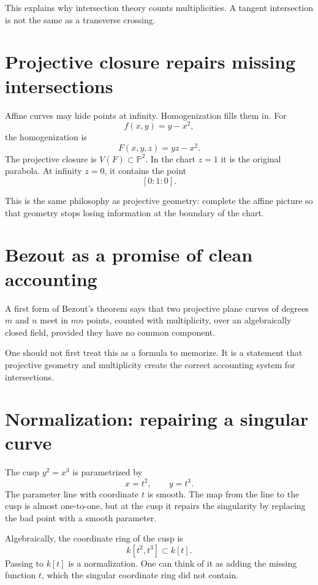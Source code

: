 This explains why intersection theory counts multiplicities. A tangent intersection is not the same as a transverse crossing.

\section{Projective closure repairs missing intersections}

Affine curves may hide points at infinity. Homogenization fills them in. For
\[
  f(x,y)=y-x^2,
\]
the homogenization is
\[
  F(x,y,z)=yz-x^2.
\]
The projective closure is \(V(F)\subset\mathbb P^2\). In the chart \(z=1\) it is the original parabola. At infinity \(z=0\), it contains the point
\[
  [0:1:0].
\]

This is the same philosophy as projective geometry: complete the affine picture so that geometry stops losing information at the boundary of the chart.

\section{Bezout as a promise of clean accounting}

A first form of Bezout's theorem says that two projective plane curves of degrees \(m\) and \(n\) meet in \(mn\) points, counted with multiplicity, over an algebraically closed field, provided they have no common component.

One should not first treat this as a formula to memorize. It is a statement that projective geometry and multiplicity create the correct accounting system for intersections.


\section{Normalization: repairing a singular curve}

The cusp \(y^2=x^3\) is parametrized by
\[
  x=t^2,\qquad y=t^3.
\]
The parameter line with coordinate \(t\) is smooth.  The map from the line to the cusp is almost one-to-one, but at the cusp it repairs the singularity by replacing the bad point with a smooth parameter.

Algebraically, the coordinate ring of the cusp is
\[
  k[t^2,t^3]\subset k[t].
\]
Passing to \(k[t]\) is a normalization.  One can think of it as adding the missing function \(t\), which the singular coordinate ring did not contain.

